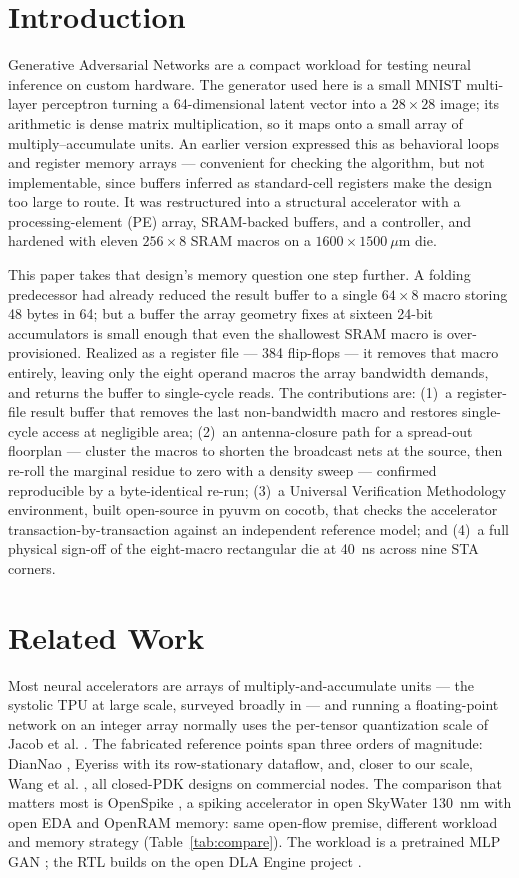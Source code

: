 \documentclass[conference,a4paper]{APSIPA2026}
\begin{document}
\section{Introduction}
Generative Adversarial Networks are a compact workload for testing neural inference on custom hardware. The generator used here is a small MNIST multi-layer perceptron turning a 64-dimensional latent vector into a $28\times28$ image; its arithmetic is dense matrix multiplication, so it maps onto a small array of multiply--accumulate units. An earlier version expressed this as behavioral loops and register memory arrays --- convenient for checking the algorithm, but not implementable, since buffers inferred as standard-cell registers make the design too large to route. It was restructured into a structural accelerator with a processing-element (PE) array, SRAM-backed buffers, and a controller, and hardened with eleven $256\times8$ SRAM macros on a $1600\times1500~\mu$m die.

This paper takes that design's memory question one step further. A folding predecessor had already reduced the result buffer to a single $64\times8$ macro storing 48 bytes in 64; but a buffer the array geometry fixes at sixteen 24-bit accumulators is small enough that even the shallowest SRAM macro is over-provisioned. Realized as a register file --- 384 flip-flops --- it removes that macro entirely, leaving only the eight operand macros the array bandwidth demands, and returns the buffer to single-cycle reads. The contributions are: (1)~a register-file result buffer that removes the last non-bandwidth macro and restores single-cycle access at negligible area; (2)~an antenna-closure path for a spread-out floorplan --- cluster the macros to shorten the broadcast nets at the source, then re-roll the marginal residue to zero with a density sweep --- confirmed reproducible by a byte-identical re-run; (3)~a Universal Verification Methodology environment, built open-source in pyuvm on cocotb, that checks the accelerator transaction-by-transaction against an independent reference model; and (4)~a full physical sign-off of the eight-macro rectangular die at 40~ns across nine STA corners.

\section{Related Work}
Most neural accelerators are arrays of multiply-and-accumulate units --- the systolic TPU \cite{tpu} at large scale, surveyed broadly in \cite{survey} --- and running a floating-point network on an integer array normally uses the per-tensor quantization scale of Jacob et al. \cite{jacob}. The fabricated reference points span three orders of magnitude: DianNao \cite{diannao}, Eyeriss \cite{eyeriss} with its row-stationary dataflow, and, closer to our scale, Wang et al. \cite{wang}, all closed-PDK designs on commercial nodes. The comparison that matters most is OpenSpike \cite{openspike}, a spiking accelerator in open SkyWater 130~nm with open EDA and OpenRAM memory: same open-flow premise, different workload and memory strategy (Table~\ref{tab:compare}). The workload is a pretrained MLP GAN \cite{goodfellow, ganpretrained}; the RTL builds on the open DLA Engine project \cite{dlaengine}.
\end{document}
